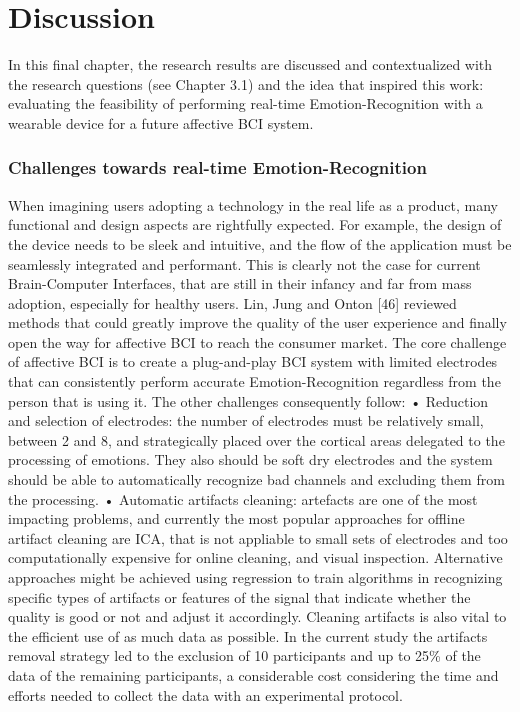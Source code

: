\chapter{Discussion}
\label{chap:discussion}
In this final chapter, the research results are discussed and contextualized with the research questions (see Chapter 3.1) and the idea that inspired this work: evaluating the feasibility of performing real-time Emotion-Recognition with a wearable device for a future affective BCI system. 

\subsection{Challenges towards real-time Emotion-Recognition}

When imagining users adopting a technology in the real life as a product, many functional and design aspects are rightfully expected. For example, the design of the device needs to be sleek and intuitive, and the flow of the application must be seamlessly integrated and performant. This is clearly not the case for current Brain-Computer Interfaces, that are still in their infancy and far from mass adoption, especially for healthy users. Lin, Jung and Onton [46] reviewed methods that could greatly improve the quality of the user experience and finally open the way for affective BCI to reach the consumer market. The core challenge of affective BCI is to create a plug-and-play BCI system with limited electrodes that can consistently perform accurate Emotion-Recognition regardless from the person that is using it. The other challenges consequently follow:
•	Reduction and selection of electrodes: the number of electrodes must be relatively small, between 2 and 8, and strategically placed over the cortical areas delegated to the processing of emotions. They also should be soft dry electrodes and the system should be able to automatically recognize bad channels and excluding them from the processing.
•	Automatic artifacts cleaning: artefacts are one of the most impacting problems, and currently the most popular approaches for offline artifact cleaning are ICA, that is not appliable to small sets of electrodes and too computationally expensive for online cleaning, and visual inspection. Alternative approaches might be achieved using regression to train algorithms in recognizing specific types of artifacts or features of the signal that indicate whether the quality is good or not and adjust it accordingly. Cleaning artifacts is also vital to the efficient use of as much data as possible. In the current study the artifacts removal strategy led to the exclusion of 10 participants and up to 25\% of the data of the remaining participants, a considerable cost considering the time and efforts needed to collect the data with an experimental protocol.
